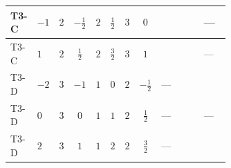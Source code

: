 \documentclass[8pt]{article}
\begin{document}
\begin{landscape}
\begin{longtable}{@{}llcccccc >{\raggedright\arraybackslash}p{0.21\linewidth} >{\raggedright\arraybackslash}p{0.21\linewidth} >{\raggedright\arraybackslash}p{0.21\linewidth}@{}}
\midrule
T3-C & $-1$ & $2$ & $-\frac{1}{2}$ & $2$ & $\frac{1}{2}$ & $3$ & $0$ & \scriptsize\adjustbox{max width=\linewidth}{$\begin{gathered} 6 {\lambda_{S_1}^{(1)}} T_{\nu}^{(1)}\end{gathered}$} & \scriptsize\adjustbox{max width=\linewidth}{$\begin{gathered} -5 \operatorname{Tr}\!\left({y_1}\,\left({y_1}\right)^{\dagger}\,{y_1}\,\left({y_1}\right)^{\dagger}\right)\end{gathered}$} & --- \\
\midrule
T3-C & $1$ & $2$ & $\frac{1}{2}$ & $2$ & $\frac{3}{2}$ & $3$ & $1$ & \scriptsize\adjustbox{max width=\linewidth}{$\begin{gathered} 6 {\lambda_{S_1}^{(1)}} T_{\nu}^{(1)}\end{gathered}$} & \scriptsize\adjustbox{max width=\linewidth}{$\begin{gathered} -5 \operatorname{Tr}\!\left({y_1}\,\left({y_1}\right)^{\dagger}\,{y_1}\,\left({y_1}\right)^{\dagger}\right)\end{gathered}$} & --- \\
\midrule
T3-D & $-2$ & $3$ & $-1$ & $1$ & $0$ & $2$ & $-\frac{1}{2}$ & --- & \scriptsize\adjustbox{max width=\linewidth}{$\begin{gathered} -3 \operatorname{Tr}\!\left({y_1}\,\left({y_1}\right)^{\dagger}\,{y_1}\,\left({y_1}\right)^{\dagger}\right)\end{gathered}$} & \scriptsize\adjustbox{max width=\linewidth}{$\begin{gathered} +12 {g_1}^4\end{gathered}$} \\
\midrule
T3-D & $0$ & $3$ & $0$ & $1$ & $1$ & $2$ & $\frac{1}{2}$ & --- & \scriptsize\adjustbox{max width=\linewidth}{$\begin{gathered} -3 \operatorname{Tr}\!\left({y_1}\,\left({y_1}\right)^{\dagger}\,{y_1}\,\left({y_1}\right)^{\dagger}\right)\end{gathered}$} & --- \\
\midrule
T3-D & $2$ & $3$ & $1$ & $1$ & $2$ & $2$ & $\frac{3}{2}$ & --- & \scriptsize\adjustbox{max width=\linewidth}{$\begin{gathered} -3 \operatorname{Tr}\!\left({y_1}\,\left({y_1}\right)^{\dagger}\,{y_1}\,\left({y_1}\right)^{\dagger}\right)\end{gathered}$} & \scriptsize\adjustbox{max width=\linewidth}{$\begin{gathered} +12 {g_1}^4\end{gathered}$} \\

\end{longtable}
\end{landscape}
\end{document}
